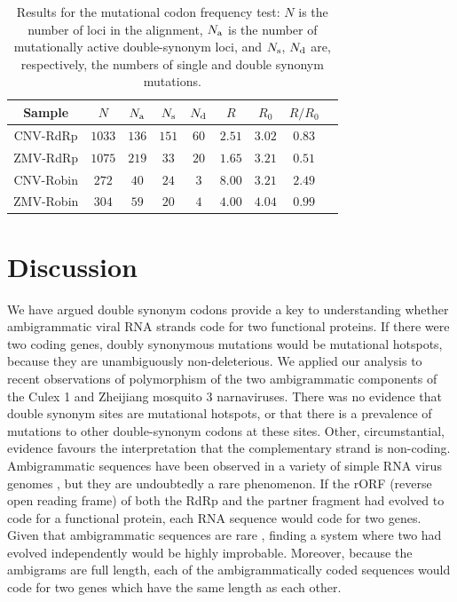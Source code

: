 \documentclass[unnumsec,webpdf,contemporary,large,namedate]{oup-authoring-template}%
\theoremstyle{thmstyleone}%
\theoremstyle{thmstyletwo}%
\theoremstyle{thmstylethree}%
\begin{document}
\begin{table}
\centering
\begin{tabular}{|c|c|c|c|c|c|c|c|c|}
\hline
Sample&$N$&$N_{\rm a}$&$N_{\rm s}$&$N_{\rm d}$&$R$&$R_0$&$R/R_0$\\ 
\hline
CNV-RdRp  &$1033$&$136$&$151$&$60$&$2.51$&$3.02$&$0.83$\\
ZMV-RdRp  &$1075$&$219$&$33$&$20$&$1.65$&$3.21$&$0.51$\\  
CNV-Robin  &$272$&$40$&$24$&$3$&$8.00$&$3.21$&$2.49$\\
ZMV-Robin  &$304$&$59$&$20$&$4$&$4.00$&$4.04$&$0.99$\\

\hline
\end{tabular}
\caption{Results for the mutational codon frequency test: $N$ is the number of loci
in the alignment, $N_{\rm a}$ is the number of mutationally active double-synonym loci, and 
$N_{\rm s}$, $N_{\rm d}$ are, respectively, the numbers of single and double synonym mutations. 
\label{tab: 5.5}}
\end{table}

\section{Discussion}
\label{sec: 6}
  
We have argued double synonym codons provide a key to understanding whether 
ambigrammatic viral RNA strands code for two functional proteins. If there were two 
coding genes, doubly synonymous mutations would be mutational hotspots, 
because they are unambiguously non-deleterious. We applied our analysis to recent 
observations of polymorphism of the two ambigrammatic components of the Culex 1 
and Zheijiang mosquito 3 narnaviruses. There was no evidence that double synonym 
sites are mutational hotspots, or that there is a prevalence of mutations to other double-synonym codons 
at these sites. Other, circumstantial, evidence favours the interpretation that the complementary strand is non-coding.
Ambigrammatic sequences have been observed in a variety of simple RNA virus genomes , 
but they are undoubtedly a rare phenomenon. 
If the rORF (reverse open reading frame) of both the RdRp and the partner fragment 
had evolved to code for a functional protein, each RNA sequence would code for two genes.
Given that ambigrammatic sequences are rare \citep{DeR+19}, finding a system where two had evolved 
independently would be highly improbable. Moreover, because the ambigrams are full length, 
each of the ambigrammatically coded sequences would code for two genes which have the same 
length as each other.
\end{document}
